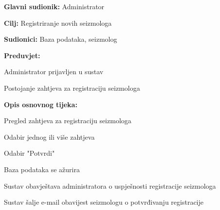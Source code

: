 					\noindent {}
					\begin{packed_item}
	
						\item \textbf{Glavni sudionik:} Administrator
						\item \textbf{Cilj:} Registriranje novih seizmologa
						\item \textbf{Sudionici:} Baza podataka, seizmolog
						\item \textbf{Preduvjet:} 
							\begin{packed_item}
								\item Administrator prijavljen u sustav
								\item Postojanje zahtjeva za registraciju seizmologa
							\end{packed_item}
						\item  \textbf{Opis osnovnog tijeka:}
						
						\item[] \begin{packed_enum}
	
							\item Pregled zahtjeva za registraciju seizmologa
							\item Odabir jednog ili više zahtjeva
							\item Odabir "Potvrdi"
							\item Baza podataka se ažurira
							\item Sustav obavještava administratora o uspješnosti registracije seizmologa
							\item Sustav šalje e-mail obavijest seizmologu o potvrđivanju registracije
							
						\end{packed_enum}
					\end{packed_item}

